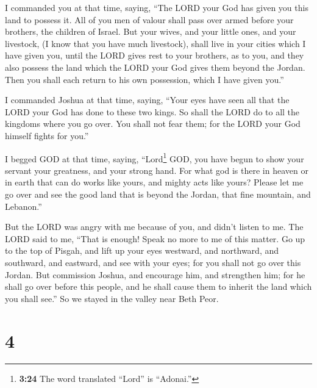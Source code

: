  I commanded you at that time, saying, ``The LORD your
God has given you this land to possess it. All of you men of valour
shall pass over armed before your brothers, the children of Israel.
 But your wives, and your little ones, and your
livestock, (I know that you have much livestock), shall live in your
cities which I have given you,  until the LORD gives rest
to your brothers, as to you, and they also possess the land which the
LORD your God gives them beyond the Jordan. Then you shall each return
to his own possession, which I have given you.''

 I commanded Joshua at that time, saying, ``Your eyes
have seen all that the LORD your God has done to these two kings. So
shall the LORD do to all the kingdoms where you go over. 
You shall not fear them; for the LORD your God himself fights for you.''

 I begged GOD at that time, saying, 
``Lord\footnote{\textbf{3:24} The word translated ``Lord'' is
  ``Adonai.''} GOD, you have begun to show your servant your greatness,
and your strong hand. For what god is there in heaven or in earth that
can do works like yours, and mighty acts like yours? 
Please let me go over and see the good land that is beyond the Jordan,
that fine mountain, and Lebanon.''

 But the LORD was angry with me because of you, and
didn't listen to me. The LORD said to me, ``That is enough! Speak no
more to me of this matter.  Go up to the top of Pisgah,
and lift up your eyes westward, and northward, and southward, and
eastward, and see with your eyes; for you shall not go over this Jordan.
 But commission Joshua, and encourage him, and strengthen
him; for he shall go over before this people, and he shall cause them to
inherit the land which you shall see.''  So we stayed in
the valley near Beth Peor.

\hypertarget{section-3}{%
\section{4}\label{section-3}}

